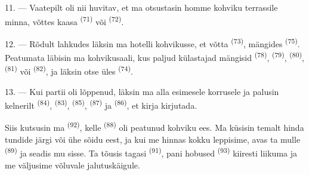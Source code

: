 \VUsaut{3.0mm}
\VUsaut{3.0mm}

11. --- Vaatepilt oli nii huvitav, et ma otsustasin homme kohviku terrassile minna,
võttes kaasa  \textsuperscript{(71)} või 
\textsuperscript{(72)}.

12. --- Rõdult lahkudes läksin ma hotelli kohvikusse, et võtta 
\textsuperscript{(73)}, mängides  \textsuperscript{(75)}.
Peatumata läbisin ma kohvikusaali, kus paljud külastajad mängisid 
\textsuperscript{(78)},  \textsuperscript{(79)}, 
\textsuperscript{(80)},  \textsuperscript{(81)} või 
\textsuperscript{(82)}, ja läksin otse üles 
\textsuperscript{(74)}.

13. --- Kui partii oli lõppenud, läksin ma alla esimesele korrusele ja palusin
kelnerilt  \textsuperscript{(84)},  \textsuperscript{(83)},
 \textsuperscript{(85)},  \textsuperscript{(87)} ja
 \textsuperscript{(86)}, et kirja kirjutada.

Siis kutsusin ma  \textsuperscript{(92)}, kelle 
\textsuperscript{(88)} oli peatunud kohviku ees. Ma küsisin temalt hinda tundide järgi
või ühe sõidu eest, ja kui me hinnas kokku leppisime, avas ta mulle 
\textsuperscript{(89)} ja seadis mu sisse. Ta tõusis tagasi 
\textsuperscript{(91)}, pani hobused  \textsuperscript{(93)} kiiresti
liikuma ja me väljusime võluvale jalutuskäigule.

\VUsaut{6.0mm}
\VUfilet{22mm}
